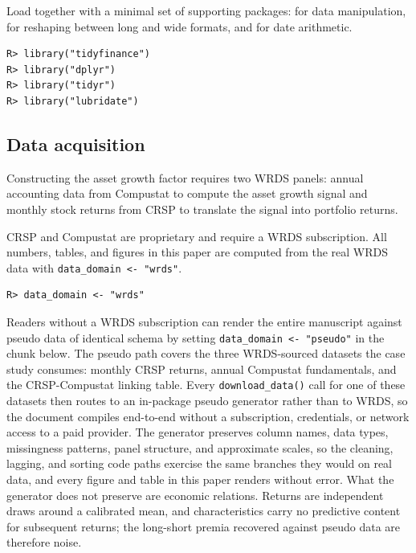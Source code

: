 \documentclass[
  article]{jss}
\begin{document}
Load  together with a minimal set of supporting
packages:  \citep{dplyr} for data manipulation, 
\citep{tidyr} for reshaping between long and wide formats, and
 \citep{lubridate} for date arithmetic.

\begin{verbatim}
R> library("tidyfinance")
R> library("dplyr")
R> library("tidyr")
R> library("lubridate")
\end{verbatim}

\subsection{Data acquisition}\label{sec-data-download}

Constructing the asset growth factor requires two WRDS panels: annual
accounting data from Compustat to compute the asset growth signal and
monthly stock returns from CRSP to translate the signal into portfolio
returns.

CRSP and Compustat are proprietary and require a WRDS subscription. All
numbers, tables, and figures in this paper are computed from the real
WRDS data with \texttt{data\_domain\ \textless{}-\ "wrds"}.

\begin{verbatim}
R> data_domain <- "wrds"
\end{verbatim}

Readers without a WRDS subscription can render the entire manuscript
against pseudo data of identical schema by setting
\texttt{data\_domain\ \textless{}-\ "pseudo"} in the chunk below. The
pseudo path covers the three WRDS-sourced datasets the case study
consumes: monthly CRSP returns, annual Compustat fundamentals, and the
CRSP-Compustat linking table. Every \texttt{download\_data()} call for
one of these datasets then routes to an in-package pseudo generator
rather than to WRDS, so the document compiles end-to-end without a
subscription, credentials, or network access to a paid provider. The
generator preserves column names, data types, missingness patterns,
panel structure, and approximate scales, so the cleaning, lagging, and
sorting code paths exercise the same branches they would on real data,
and every figure and table in this paper renders without error. What the
generator does not preserve are economic relations. Returns are
independent draws around a calibrated mean, and characteristics carry no
predictive content for subsequent returns; the long-short premia
recovered against pseudo data are therefore noise.
\end{document}
